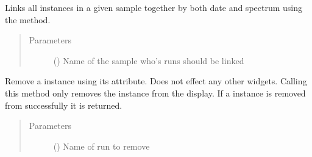 \documentclass[letterpaper,10pt,english]{sphinxmanual}
\begin{document}
\begin{fulllineitems}
\begin{fulllineitems}
\label{\detokenize{polo.widgets:polo.widgets.run_tree.RunTree.link_sample}}
Links all  instances in a given sample together by both date
and spectrum using the {\hyperref[\detokenize{polo.utils:polo.utils.io_utils.RunLinker.the_big_link}]{}}
method.
\begin{quote}\begin{description}
\item[{Parameters}] \leavevmode
{} () \textendash{} Name of the sample who’s runs should be linked

\end{description}\end{quote}

\end{fulllineitems}


\begin{fulllineitems}
\label{\detokenize{polo.widgets:polo.widgets.run_tree.RunTree.opening_run}}
\end{fulllineitems}


\begin{fulllineitems}
\label{\detokenize{polo.widgets:polo.widgets.run_tree.RunTree.remove_run_from_view}}
Remove a  instance using its  attribute.
Does not effect any other widgets. Calling this method only 
removes the  instance from
the display. If a  instance is removed from successfully
it is returned.
\begin{quote}\begin{description}
\item[{Parameters}] \leavevmode
{} () \textendash{} Name of run to remove


\end{description}
\end{quote}
\end{fulllineitems}
\end{fulllineitems}
\end{document}
